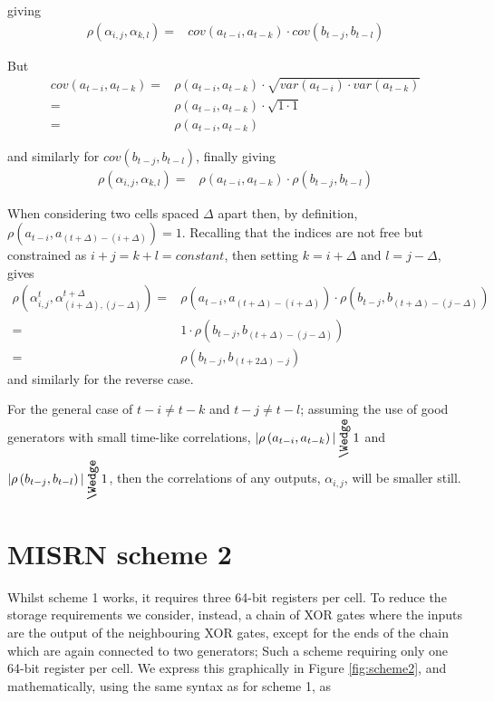 \documentclass{article}
\newcommand{\MuchLess}{\mathbin{\rotatebox[origin=c]{90}{$\Wedge$}}}
\newcommand{\corr}[2]{\rho\left( #1 , #2 \right)}
\newcommand{\cov}[2]{\textit{cov}\left( #1 , #2 \right)}
\newcommand{\var}[1]{\textit{var}\left( #1 \right)}
\renewcommand{\a}[1]{a_{t-#1}}
\renewcommand{\b}[1]{b_{t-#1}}
\begin{document}
giving
\begin{align}
  \corr{\alpha_{i,j}}{\alpha_{k,l}} = & \cov{\a{i}}{\a{k}} \cdot \cov{\b{j}}{\b{l}}
\end{align}

But
\begin{align}
  \cov{\a{i}}{\a{k}} = & \corr{\a{i}}{\a{k}} \cdot \sqrt{\var{\a{i}} \cdot \var{\a{k}}} \\
                     = & \corr{\a{i}}{\a{k}} \cdot \sqrt{ 1 \cdot 1 } \\
                     = & \corr{\a{i}}{\a{k}}
\end{align}

and similarly for $\cov{\b{j}}{\b{l}}$, finally giving
\begin{align}
  \corr{\alpha_{i,j}}{\alpha_{k,l}} = & \corr{\a{i}}{\a{k}} \cdot \corr{\b{j}}{\b{l}}
\end{align}

When considering two cells spaced $\Delta$ apart then, by definition, $\corr{\a{i}}{a_{(t+\Delta)-(i+\Delta)}} = 1$. Recalling that the indices are not free but constrained as $i+j = k+l = \textit{constant}$, then setting $k=i+\Delta$ and $l=j-\Delta$, gives
\begin{align}
  \corr{\alpha^{t}_{i,j}}{\alpha^{t+\Delta}_{(i+\Delta),(j-\Delta)}} = & \corr{\a{i}}{a_{(t+\Delta)-(i+\Delta)}} \cdot \corr{\b{j}}{b_{(t+\Delta)-(j-\Delta)}} \\
                                                                     = & 1 \cdot \corr{\b{j}}{b_{(t+\Delta)-(j-\Delta)}} \\
                                                                     = & \corr{\b{j}}{b_{(t+2\Delta)-j}}
\end{align}
and similarly for the reverse case.

For the general case of $t-i \neq t-k$ and $t-j \neq t-l$; assuming the use of good generators with small time-like correlations, $|\corr{\a{i}}{\a{k}}| \MuchLess 1$ and $|\corr{\b{j}}{\b{l}}| \MuchLess 1$, then the correlations of any outputs, $\alpha_{i,j}$, will be smaller still.


\section{MISRN scheme 2}

Whilst scheme 1 works, it requires three 64-bit registers per cell. To reduce the storage requirements we consider, instead, a chain of XOR gates where the inputs are the output of the neighbouring XOR gates, except for the ends of the chain which are again connected to two generators; Such a scheme requiring only one 64-bit register per cell.
We express this graphically in Figure \ref{fig:scheme2}, and mathematically, using the same syntax as for scheme 1, as 
\end{document}

